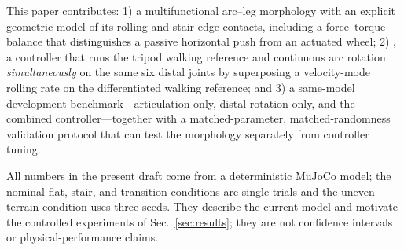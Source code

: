 This paper contributes: 1) a multifunctional arc--leg morphology with an explicit
geometric model of its rolling and stair-edge contacts, including a force--torque
balance that distinguishes a passive horizontal push from an actuated wheel;
2) \gaitname{}, a controller that runs the tripod walking reference and
continuous arc rotation \emph{simultaneously} on the same six distal joints by
superposing a velocity-mode rolling rate on the differentiated walking reference;
and 3) a same-model development benchmark---articulation only, distal rotation
only, and the combined controller---together with a matched-parameter,
matched-randomness validation protocol that can test the morphology separately
from controller tuning.

All numbers in the present draft come from a deterministic MuJoCo model; the
nominal flat, stair, and transition conditions are single trials and the
uneven-terrain condition uses three seeds. They describe the current model and
motivate the controlled experiments of Sec.~\ref{sec:results}; they are not
confidence intervals or physical-performance claims.
